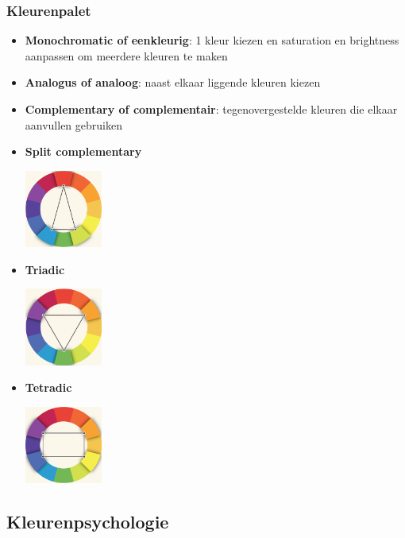 \documentclass{article}
\newcommand{\bold}[1]{\textbf{#1}}
\begin{document}
\subsubsection{Kleurenpalet}
\begin{itemize}
    \item \bold{Monochromatic of eenkleurig}: 1 kleur kiezen en saturation en brightness aanpassen om meerdere kleuren te maken
    \item \bold{Analogus of analoog}: naast elkaar liggende kleuren kiezen
    \item \bold{Complementary of complementair}: tegenovergestelde kleuren die elkaar aanvullen gebruiken
    \item \bold{Split complementary}

\includegraphics[width=0.2\textwidth]{img/Screenshot_20200217_092108.png}
    \item \bold{Triadic}
    
\includegraphics[width=0.2\textwidth]{img/Screenshot_20200217_092125.png}
    \item \bold{Tetradic}
    
\includegraphics[width=0.2\textwidth]{img/Screenshot_20200217_092143.png}
\end{itemize}



\subsection{Kleurenpsychologie}
\end{document}
